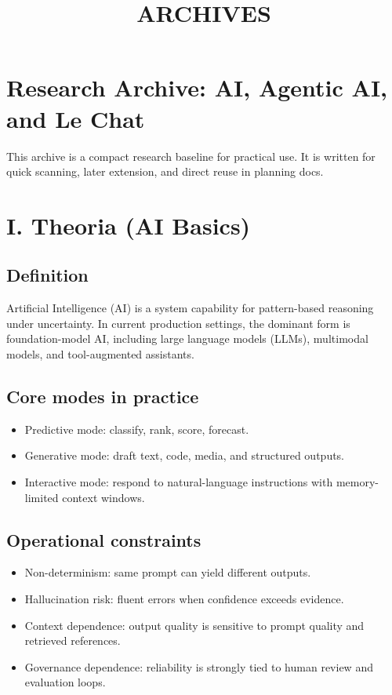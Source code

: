 \documentclass[10pt]{article}
\title{ARCHIVES}
\author{}
\date{}
\begin{document}
\maketitle
\thispagestyle{empty}

\section*{Research Archive: AI, Agentic AI, and Le Chat}

This archive is a compact research baseline for practical use.
It is written for quick scanning, later extension, and direct reuse in planning docs.

\section*{I. Theoria (AI Basics)}

\subsection*{Definition}
Artificial Intelligence (AI) is a system capability for pattern-based reasoning under uncertainty.
In current production settings, the dominant form is foundation-model AI, including large language models (LLMs), multimodal models, and tool-augmented assistants.

\subsection*{Core modes in practice}
\begin{itemize}
  \item Predictive mode: classify, rank, score, forecast.
  \item Generative mode: draft text, code, media, and structured outputs.
  \item Interactive mode: respond to natural-language instructions with memory-limited context windows.
\end{itemize}

\subsection*{Operational constraints}
\begin{itemize}
  \item Non-determinism: same prompt can yield different outputs.
  \item Hallucination risk: fluent errors when confidence exceeds evidence.
  \item Context dependence: output quality is sensitive to prompt quality and retrieved references.
  \item Governance dependence: reliability is strongly tied to human review and evaluation loops.
\end{itemize}
\end{document}
